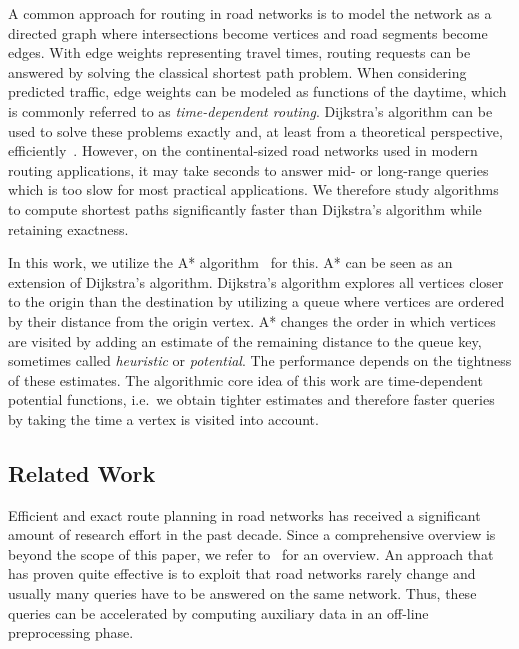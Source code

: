 \documentclass[a4paper,UKenglish,cleveref, autoref, thm-restate,anonymous]{lipics-v2021}
\begin{document}
A common approach for routing in road networks is to model the network as a directed graph where intersections become vertices and road segments become edges.
With edge weights representing travel times, routing requests can be answered by solving the classical shortest path problem.
When considering predicted traffic, edge weights can be modeled as functions of the daytime, which is commonly referred to as \emph{time-dependent routing}.
Dijkstra's algorithm can be used to solve these problems exactly and, at least from a theoretical perspective, efficiently~\cite{d-ntpcg-59}.
However, on the continental-sized road networks used in modern routing applications, it may take seconds to answer mid- or long-range queries which is too slow for most practical applications.
We therefore study algorithms to compute shortest paths significantly faster than Dijkstra's algorithm while retaining exactness.

In this work, we utilize the A* algorithm~\cite{hnr-afbhd-68} for this.
A* can be seen as an extension of Dijkstra's algorithm.
Dijkstra's algorithm explores all vertices closer to the origin than the destination by utilizing a queue where vertices are ordered by their distance from the origin vertex.
A* changes the order in which vertices are visited by adding an estimate of the remaining distance to the queue key, sometimes called \emph{heuristic} or \emph{potential}.
The performance depends on the tightness of these estimates.
The algorithmic core idea of this work are time-dependent potential functions, i.e.\ we obtain tighter estimates and therefore faster queries by taking the time a vertex is visited into account.

\subsection{Related Work}

Efficient and exact route planning in road networks has received a significant amount of research effort in the past decade.
Since a comprehensive overview is beyond the scope of this paper, we refer to~\cite{bdgmpsww-rptn-16} for an overview.
An approach that has proven quite effective is to exploit that road networks rarely change and usually many queries have to be answered on the same network.
Thus, these queries can be accelerated by computing auxiliary data in an off-line preprocessing phase.
\end{document}
